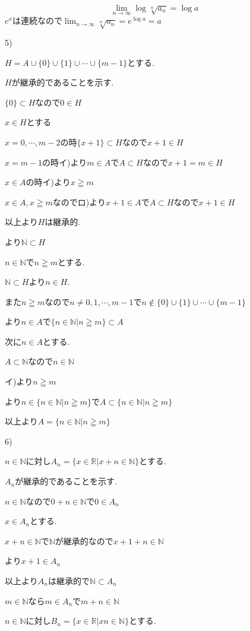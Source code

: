 \documentclass{jsarticle}
\begin{document}
\[\lim_{n\to\infty}\log \sqrt[n]{a_n} = \log a\]
$e^x$は連続なので$\lim_{n\to\infty}\sqrt[n]{a_n} = e^{\log a} = a$

5)

$H = A\cup \{0\} \cup \{1\} \cup \cdots \cup \{m-1\}$とする.

$H$が継承的であることを示す.

$\{0\}\subset H$なので$0\in H$

$x\in H$とする

$x = 0,\cdots , m-2$の時$\{x+1\}\subset H$なので$x+1\in H$

$x = m-1$の時イ)より$m\in A$で$A\subset H$なので$x+1=m\in H$

$x\in A$の時イ)より$x\geqq m$

$x\in A,x\geqq m$なのでロ)より$x+1\in A$で$A\subset H$なので$x+1\in H$

以上より$H$は継承的.

より$\mathbb{N}\subset H$

$n\in \mathbb{N}$で$n\geqq m$とする.

$\mathbb{N}\subset H$より$n\in H$.

また$n\geqq m$なので$n \neq 0,1,\cdots , m-1$で$n\notin  \{0\} \cup \{1\} \cup \cdots \cup \{m-1\}$

より$n\in A$で$\{n\in \mathbb{N}|n\geqq m\}\subset A$

次に$n\in A$とする.

$A\subset \mathbb{N}$なので$n\in\mathbb{N}$

イ)より$n\geqq m$

より$n\in \{n\in \mathbb{N}|n\geqq m\}$で$A\subset \{n\in \mathbb{N}|n\geqq m\}$

以上より$A=\{n\in \mathbb{N}|n\geqq m\}$

6)

$n\in \mathbb{N}$に対し$A_n=\{x\in \mathbb{R}|x+n\in\mathbb{N}\}$とする.

$A_n$が継承的であることを示す.

$n\in \mathbb{N}$なので$0+n\in \mathbb{N}$で$0\in A_n$

$x\in A_n$とする.

$x+n\in \mathbb{N}$で$\mathbb{N}$が継承的なので$x+1+n\in \mathbb{N}$

より$x+1\in A_n$

以上より$A_n$は継承的で$\mathbb{N} \subset A_n$

$m\in \mathbb{N}$なら$m\in A_n$で$m+n\in\mathbb{N}$

$n\in \mathbb{N}$に対し$B_n=\{x\in \mathbb{R}|xn\in\mathbb{N}\}$とする.
\end{document}

